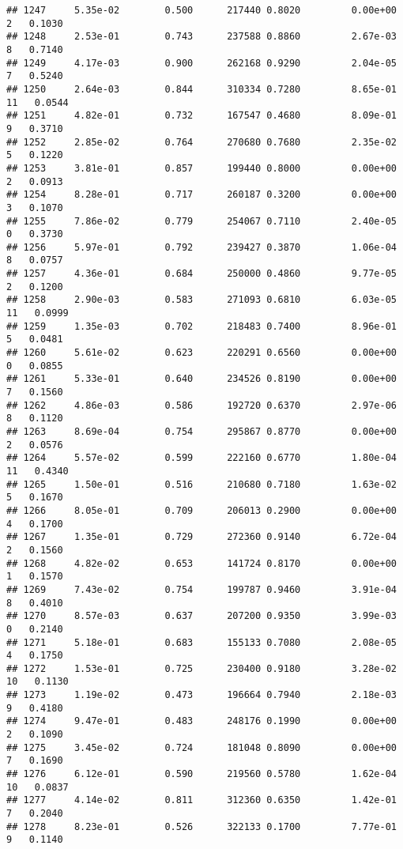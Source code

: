 \documentclass[
]{article}
\begin{document}
\begin{verbatim}
## 1247     5.35e-02        0.500      217440 0.8020         0.00e+00   2   0.1030
## 1248     2.53e-01        0.743      237588 0.8860         2.67e-03   8   0.7140
## 1249     4.17e-03        0.900      262168 0.9290         2.04e-05   7   0.5240
## 1250     2.64e-03        0.844      310334 0.7280         8.65e-01  11   0.0544
## 1251     4.82e-01        0.732      167547 0.4680         8.09e-01   9   0.3710
## 1252     2.85e-02        0.764      270680 0.7680         2.35e-02   5   0.1220
## 1253     3.81e-01        0.857      199440 0.8000         0.00e+00   2   0.0913
## 1254     8.28e-01        0.717      260187 0.3200         0.00e+00   3   0.1070
## 1255     7.86e-02        0.779      254067 0.7110         2.40e-05   0   0.3730
## 1256     5.97e-01        0.792      239427 0.3870         1.06e-04   8   0.0757
## 1257     4.36e-01        0.684      250000 0.4860         9.77e-05   2   0.1200
## 1258     2.90e-03        0.583      271093 0.6810         6.03e-05  11   0.0999
## 1259     1.35e-03        0.702      218483 0.7400         8.96e-01   5   0.0481
## 1260     5.61e-02        0.623      220291 0.6560         0.00e+00   0   0.0855
## 1261     5.33e-01        0.640      234526 0.8190         0.00e+00   7   0.1560
## 1262     4.86e-03        0.586      192720 0.6370         2.97e-06   8   0.1120
## 1263     8.69e-04        0.754      295867 0.8770         0.00e+00   2   0.0576
## 1264     5.57e-02        0.599      222160 0.6770         1.80e-04  11   0.4340
## 1265     1.50e-01        0.516      210680 0.7180         1.63e-02   5   0.1670
## 1266     8.05e-01        0.709      206013 0.2900         0.00e+00   4   0.1700
## 1267     1.35e-01        0.729      272360 0.9140         6.72e-04   2   0.1560
## 1268     4.82e-02        0.653      141724 0.8170         0.00e+00   1   0.1570
## 1269     7.43e-02        0.754      199787 0.9460         3.91e-04   8   0.4010
## 1270     8.57e-03        0.637      207200 0.9350         3.99e-03   0   0.2140
## 1271     5.18e-01        0.683      155133 0.7080         2.08e-05   4   0.1750
## 1272     1.53e-01        0.725      230400 0.9180         3.28e-02  10   0.1130
## 1273     1.19e-02        0.473      196664 0.7940         2.18e-03   9   0.4180
## 1274     9.47e-01        0.483      248176 0.1990         0.00e+00   2   0.1090
## 1275     3.45e-02        0.724      181048 0.8090         0.00e+00   7   0.1690
## 1276     6.12e-01        0.590      219560 0.5780         1.62e-04  10   0.0837
## 1277     4.14e-02        0.811      312360 0.6350         1.42e-01   7   0.2040
## 1278     8.23e-01        0.526      322133 0.1700         7.77e-01   9   0.1140

\end{verbatim}
\end{document}
